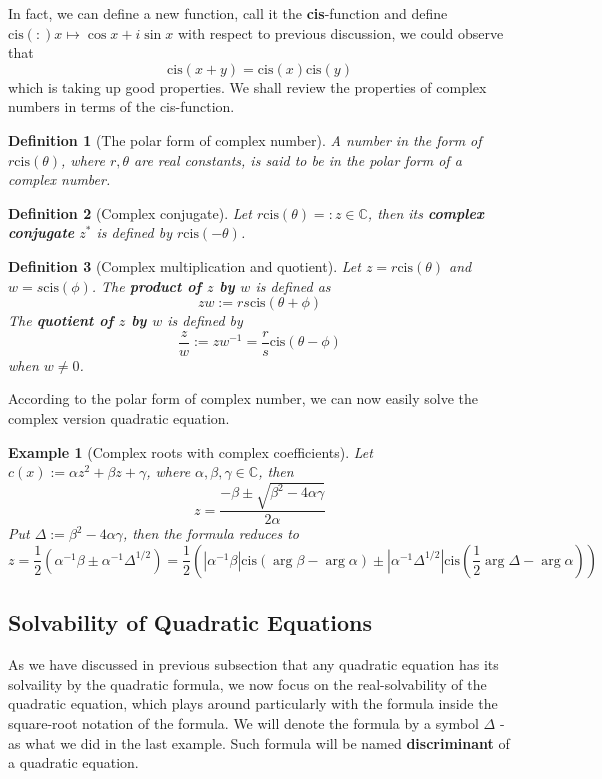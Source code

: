 \documentclass[12pt]{article}
\newcommand{\cis}[1]{\mathrm{cis}({#1})}
\newtheorem{definition}{Definition}[section]
\newtheorem*{example}{Example}
\begin{document}
    In fact, we can define a new function, call it the \textbf{cis}-function and define $\cis:x\mapsto \cos{x}+i\sin{x}$ with respect to previous discussion, we could observe that \[\cis{x+y}=\cis{x}\cis{y}\] which is taking up good properties. We shall review the properties of complex numbers in terms of the cis-function.

    \begin{definition}[The polar form of complex number]
        A number in the form of $r\cis{\theta}$, where $r,\theta$ are real constants, is said to be in the polar form of a complex number.
    \end{definition}

    \begin{definition}[Complex conjugate]
        Let $r\cis{\theta}=:z\in\mathbb{C}$, then its \textbf{complex conjugate} $z^*$ is defined by $r\cis{-\theta}$.
    \end{definition}

    \begin{definition}[Complex multiplication and quotient]
        Let $z=r\cis{\theta}$ and $w=s\cis{\phi}$. The \textbf{product of $z$ by $w$} is defined as \[zw:=rs\cis{\theta+\phi}\] The \textbf{quotient of $z$ by $w$} is defined by \[\frac{z}{w}:=zw^{-1}=\frac{r}{s}\cis{\theta-\phi}\] when $w\neq 0$.
    \end{definition}

    According to the polar form of complex number, we can now easily solve the complex version quadratic equation.

    \begin{example}[Complex roots with complex coefficients]
        Let $c(x):=\alpha z^2+\beta z+\gamma$, where $\alpha,\beta,\gamma\in\mathbb{C}$, then \[z=\frac{-\beta \pm\sqrt{\beta^2-4\alpha\gamma}}{2\alpha}\]
        Put $\Delta:=\beta^2-4\alpha\gamma$, then the formula reduces to \[z=\frac{1}{2}(\alpha^{-1}\beta\pm\alpha^{-1}\Delta^{1/2})=\frac{1}{2}(|\alpha^{-1}\beta|\cis{\arg{\beta}-\arg{\alpha}}\pm|\alpha^{-1}\Delta^{1/2}|\cis{\frac{1}{2}\arg{\Delta}-\arg{\alpha}})\]
    \end{example}

    \subsection{Solvability of Quadratic Equations}

    As we have discussed in previous subsection that any quadratic equation has its solvaility by the quadratic formula, we now focus on the real-solvability of the quadratic equation, which plays around particularly with the formula inside the square-root notation of the formula. We will denote the formula by a symbol $\Delta$ - as what we did in the last example. Such formula will be named \textbf{discriminant} of a quadratic equation.
\end{document}
